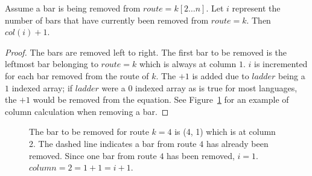 \begin{lemma}
 Assume a bar is being removed from $route=k[2 \dots n]$. 
  Let $i$ represent the number of bars that have currently been removed from $route=k$. 
  Then $col(i)+1$.
\end{lemma}
\begin{proof}
  The bars are removed left to right. The first bar to be removed is the leftmost bar belonging to $route=k$ which 
  is always at column $1$. $i$ is incremented for each bar removed from the route of $k$. 
  The $+1$ is added due to $ladder$ being a $1$ indexed array; if $ladder$ were a $0$ indexed array as is true for most languages, the $+1$
  would be removed from the equation. See Figure~\ref{Fig:SJTcase4}
  for an example of column calculation when removing a bar.
\end{proof}
\begin{figure}[h]
  \begin{center}
  \end{center}
  \caption{The bar to be removed for route $k=4$ is (4, 1) which is at column 2. The dashed line indicates a bar 
  from route $4$ has already been removed. Since one bar from route $4$ has been removed, $i=1$. $column= 2 = 1+1 = i + 1$.}

  \label{Fig:SJTcase4}
\end{figure}
\pagebreak
